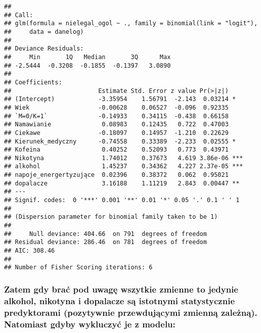 \documentclass[]{article}
\begin{document}
\begin{verbatim}
## 
## Call:
## glm(formula = nielegal_ogol ~ ., family = binomial(link = "logit"), 
##     data = danelog)
## 
## Deviance Residuals: 
##     Min       1Q   Median       3Q      Max  
## -2.5444  -0.3208  -0.1855  -0.1397   3.0890  
## 
## Coefficients:
##                        Estimate Std. Error z value Pr(>|z|)    
## (Intercept)            -3.35954    1.56791  -2.143  0.03214 *  
## Wiek                   -0.00628    0.06527  -0.096  0.92335    
## `M=0/K=1`              -0.14933    0.34115  -0.438  0.66158    
## Namawianie              0.08983    0.12435   0.722  0.47003    
## Ciekawe                -0.18097    0.14957  -1.210  0.22629    
## Kierunek_medyczny      -0.74558    0.33389  -2.233  0.02555 *  
## Kofeina                 0.40252    0.52093   0.773  0.43971    
## Nikotyna                1.74012    0.37673   4.619 3.86e-06 ***
## alkohol                 1.45237    0.34362   4.227 2.37e-05 ***
## napoje_energertyzujące  0.02396    0.38372   0.062  0.95021    
## dopalacze               3.16188    1.11219   2.843  0.00447 ** 
## ---
## Signif. codes:  0 '***' 0.001 '**' 0.01 '*' 0.05 '.' 0.1 ' ' 1
## 
## (Dispersion parameter for binomial family taken to be 1)
## 
##     Null deviance: 404.66  on 791  degrees of freedom
## Residual deviance: 286.46  on 781  degrees of freedom
## AIC: 308.46
## 
## Number of Fisher Scoring iterations: 6
\end{verbatim}

\subsubsection{Zatem gdy brać pod uwagę wszytkie zmienne to jedynie
alkohol, nikotyna i dopalacze są istotnymi statystycznie predyktorami
(pozytywnie przewdującymi zmienną zależną). Natomiast gdyby wykluczyć je
z
modelu:}\label{zatem-gdy-brac-pod-uwage-wszytkie-zmienne-to-jedynie-alkohol-nikotyna-i-dopalacze-sa-istotnymi-statystycznie-predyktorami-pozytywnie-przewdujacymi-zmienna-zalezna.-natomiast-gdyby-wykluczyc-je-z-modelu}
\end{document}
